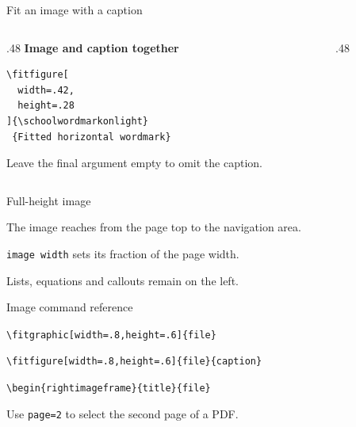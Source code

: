 \begin{frame}[fragile]{Fit an image with a caption}
  \begin{columns}[T,onlytextwidth]
    \begin{column}{.48\textwidth}
      \textbf{Image and caption together}
      \begin{verbatim}
\fitfigure[
  width=.42,
  height=.28
]{\schoolwordmarkonlight}
 {Fitted horizontal wordmark}
      \end{verbatim}
      Leave the final argument empty to omit the caption.
    \end{column}
    \begin{column}{.48\textwidth}
    \end{column}
  \end{columns}
\end{frame}

\begin{rightimageframe}[image width=.40]{Full-height image}{\campusexampleimage}
  \begin{description}[Height]
    \item[Height] The image reaches from the page top to the navigation area.
    \item[Width] \texttt{image width} sets its fraction of the page width.
    \item[Body] Lists, equations and callouts remain on the left.
  \end{description}
\end{rightimageframe}

\begin{frame}[fragile]{Image command reference}
  \begin{description}
    \item[Fit] \verb|\fitgraphic[width=.8,height=.6]{file}|
    \item[Caption] \verb|\fitfigure[width=.8,height=.6]{file}{caption}|
    \item[Right] \verb|\begin{rightimageframe}{title}{file}|
    \item[PDF page] Use \texttt{page=2} to select the second page of a PDF.
  \end{description}
\end{frame}
